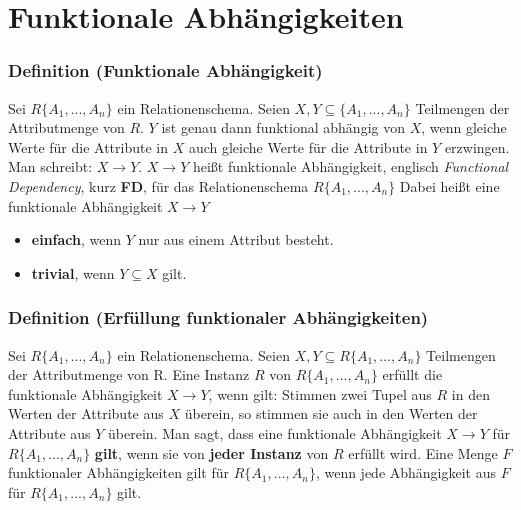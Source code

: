 \documentclass{lehramt-informatik}
\begin{document}
\chapter{Funktionale Abhängigkeiten}

%

%

\subsection{Definition (Funktionale Abhängigkeit)}

Sei $R\{A_1,...,A_n\}$ ein Relationenschema. Seien $X, Y \subseteq
\{A_1,...,A_n\}$ Teilmengen der Attributmenge von $R$. $Y$ ist genau
dann funktional abhängig von $X$, wenn gleiche Werte für die Attribute
in $X$ auch gleiche Werte für die Attribute in $Y$ erzwingen. Man
schreibt: $X \rightarrow Y$. $X \rightarrow Y$ heißt funktionale
Abhängigkeit, englisch \emph{Functional Dependency}, kurz \textbf{FD},
für das Relationenschema $R\{A_1,...,A_n\}$ Dabei heißt eine funktionale
Abhängigkeit $X \rightarrow Y$

\begin{itemize}
\item \textbf{einfach}, wenn $Y$ nur aus einem Attribut besteht.
\item \textbf{trivial}, wenn $Y \subseteq X$ gilt.
\end{itemize}

%

\subsection{Definition (Erfüllung funktionaler Abhängigkeiten)}

Sei $R\{A_1,...,A_n\}$ ein Relationenschema. Seien $X, Y \subseteq
R\{A_1,...,A_n\}$ Teilmengen der Attributmenge von R. Eine Instanz $R$
von $R\{A_1,...,A_n\}$ erfüllt die funktionale Abhängigkeit $X
\rightarrow Y$, wenn gilt: Stimmen zwei Tupel aus $R$ in den Werten der
Attribute aus $X$ überein, so stimmen sie auch in den Werten der
Attribute aus $Y$ überein. Man sagt, dass eine funktionale Abhängigkeit
$X \rightarrow Y$ für $R\{A_1,...,A_n\}$ \textbf{gilt}, wenn sie von
\textbf{jeder Instanz} von $R$ erfüllt wird. Eine Menge $F$ funktionaler
Abhängigkeiten gilt für $R\{A_1,...,A_n\}$, wenn jede Abhängigkeit aus
$F$ für $R\{A_1,...,A_n\}$ gilt.
\end{document}
